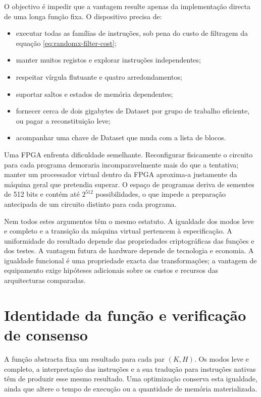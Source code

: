 O objectivo é impedir que a vantagem resulte apenas da implementação directa
de uma longa função fixa. O dispositivo precisa de:
\begin{itemize}
 \item executar todas as famílias de instruções, sob pena do custo de filtragem
 da equação \eqref{eq:randomx-filter-cost};
 \item manter muitos registos e explorar instruções independentes;
 \item respeitar vírgula flutuante e quatro arredondamentos;
 \item suportar saltos e estados de memória dependentes;
 \item fornecer cerca de dois gigabytes de Dataset por grupo de trabalho
 eficiente, ou pagar a reconstituição leve;
 \item acompanhar uma chave de Dataset que muda com a lista de blocos.
\end{itemize}

Uma FPGA enfrenta dificuldade semelhante. Reconfigurar fisicamente o circuito
para cada programa demoraria incomparavelmente mais do que a tentativa; manter
um processador virtual dentro da FPGA aproxima-a justamente da máquina geral
que pretendia superar. O espaço de programas deriva de sementes de 512 bits e
contém até \(2^{512}\) possibilidades, o que impede a preparação antecipada de
um circuito distinto para cada programa.

Nem todos estes argumentos têm o mesmo estatuto. A igualdade dos modos leve e
completo e a transição da máquina virtual pertencem à especificação. A
uniformidade do resultado depende das propriedades criptográficas das funções
e dos testes. A vantagem futura de hardware depende de tecnologia e economia.
A igualdade funcional é uma propriedade exacta das transformações; a vantagem
de equipamento exige hipóteses adicionais sobre os custos e recursos das
arquitecturas comparadas.


\section{Identidade da função e verificação de consenso}
\label{sec:randomx-status}

A função abstracta fixa um resultado para cada par \((K,H)\). Os modos
leve e completo, a interpretação das instruções e a sua tradução para
instruções nativas têm de produzir esse mesmo resultado. Uma optimização
conserva esta igualdade, ainda que altere o tempo de execução ou a quantidade
de memória materializada.

